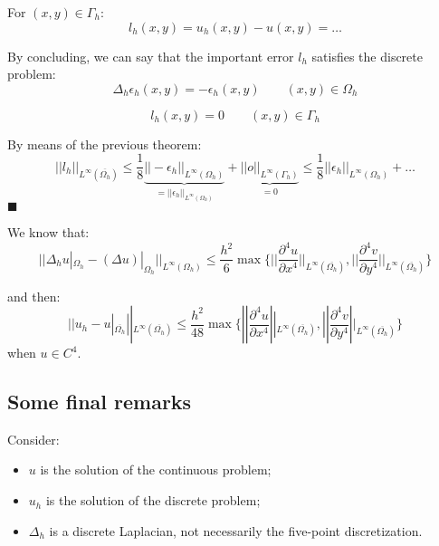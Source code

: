 For $(x, y) \in \Gamma_h$:
\begin{equation*}
l_h (x, y) = u_h (x, y) - u(x, y) = \dots
\end{equation*}

By concluding, we can say that the important error $l_h$ satisfies the discrete problem:
\begin{equation*}
\Delta_h \epsilon_h (x, y) = - \epsilon_h(x, y) \qquad (x, y) \in \Omega_h
\end{equation*}

\begin{equation*}
l_h(x, y) = 0 \qquad (x, y) \in \Gamma_h
\end{equation*}

By means of the previous theorem:
\begin{equation*}
||l_h||_{L^\infty(\overline{\Omega_h})} \le \frac{1}{8} \underbrace{|| -\epsilon_h||_{L^\infty(\Omega_h)}}_{= || \epsilon_h ||_{L^\infty(\Omega_h)} } + \underbrace{||o||_{L^\infty(\Gamma_h)}}_{= 0} \le \frac{1}{8} ||\epsilon_h||_{L^\infty(\Omega_h)} + \dots
\end{equation*}
$\blacksquare$

We know that:
\begin{equation*}
|| \Delta_h u|_{\Omega_h} - (\Delta u)|_{\Omega_h} ||_{L^\infty(\Omega_h)} \le \frac{h^2}{6} \max \{ ||\frac{\partial^4 u}{\partial x^4}||_{L^\infty(\overline{\Omega_h})}, ||\frac{\partial^4 v}{\partial y^4}||_{L^\infty(\overline{\Omega_h})} \}
\end{equation*}

and then:
\begin{equation*}
|| u_h - u|_{\overline{\Omega_h}} ||_{L^\infty(\overline{\Omega_h})} \le \frac{h^2}{48} \max \{ ||\frac{\partial^4 u}{\partial x^4}||_{L^\infty(\overline{\Omega_h})}, ||\frac{\partial^4 v}{\partial y^4}||_{L^\infty(\overline{\Omega_h})} \}
\end{equation*}
when $u \in C^4$.

\subsection{Some final remarks}

Consider:
\begin{itemize}
	\item $u$ is the solution of the continuous problem;
	\item $u_h$ is the solution of the discrete problem;
	\item $\Delta_h$ is a discrete Laplacian, not necessarily the five-point discretization.
\end{itemize}

